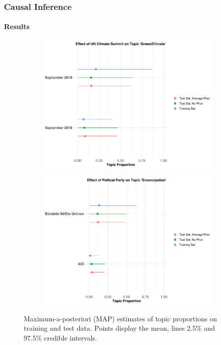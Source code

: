 \documentclass[xcolor=dvipsnames]{beamer}
\begin{document}
\begin{frame}
\frametitle{Causal Inference}
\framesubtitle{Results}
\begin{figure}[h!]
  \centering
  \captionsetup{justification=centering}
  \begin{subfigure}[b]{0.49\linewidth}
    \includegraphics[width=\linewidth]{../../plots/presentation/climate_summit_props.pdf}
  \end{subfigure}
  \begin{subfigure}[b]{0.49\linewidth}
    \includegraphics[width=\linewidth]{../../plots/presentation/emancipation_props.pdf}
  \end{subfigure}
  \caption{Maximum-a-posteriori (MAP) estimates of topic proportions on training and test data. Points display the mean, lines 2.5\% and 97.5\% credible intervals.}
  \label{fig:causal_inference_props}
\end{figure}
\end{frame}
\end{document}
